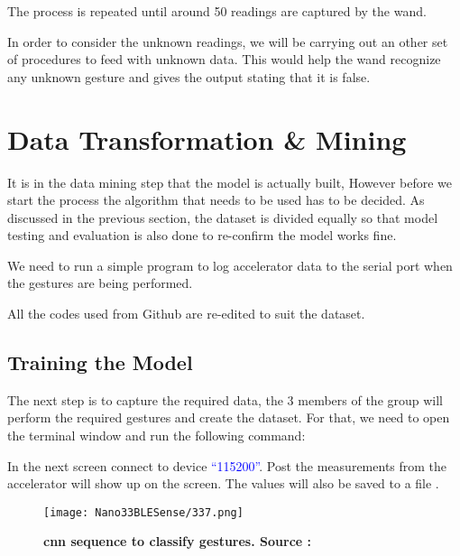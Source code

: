 The process is repeated until around 50 readings are captured by the wand.


\bigskip

In order to consider the unknown readings, we will be carrying out an other set of procedures to feed with unknown data. This would help the wand recognize any unknown gesture and gives the output stating that it is false. \cite{Warden:2020}









\section{Data Transformation \& Mining}
It is in the data mining step that the model is actually built, However before we start the process the algorithm that needs to be used has to be decided. As discussed in the previous section, the dataset is divided equally so that model testing and evaluation is also done to re-confirm the model works fine.

We need to run a simple program to log accelerator data to the serial port when the gestures are being performed. \cite{Warden:2020}


All the codes used from Github are re-edited to suit the dataset.

\subsection{Training the Model}

The next step is to capture the required data, the 3 members of the group will perform the required gestures and create the dataset. For that, we need to open the terminal window and run the following command:

\medskip


\medskip

In the next screen connect to device \textcolor{blue}{``115200''}. Post the measurements from the accelerator will show up on the screen. The values will also be saved to a file . \cite{Warden:2020}

\begin{figure}
    \texttt{[image: Nano33BLESense/337.png]}
    \caption{\textbf{\ac{cnn} sequence to classify gestures. Source : \cite{Warden:2020}}}
    \label{fig:T1}
\end{figure}

